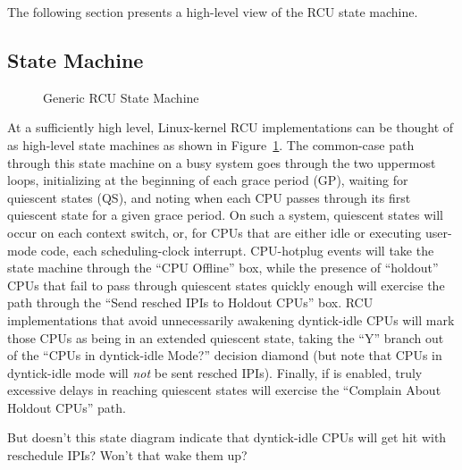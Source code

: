 The following section presents a high-level view of the RCU state machine.

\subsection{State Machine}
\label{app:rcuimpl:rcutree:State Machine}

\begin{figure}[htbp]
\centering
{}
\caption{Generic RCU State Machine}
\label{fig:app:rcuimpl:rcutree:Generic RCU State Machine}
\end{figure}

At a sufficiently high level, Linux-kernel RCU implementations can
be thought of as high-level state machines as shown in
Figure~\ref{fig:app:rcuimpl:rcutree:Generic RCU State Machine}.
The common-case path through this state machine on a busy system
goes through the two uppermost loops, initializing at the
beginning of each grace period (GP),
waiting for quiescent states (QS), and noting when each CPU passes through
its first quiescent state for a given grace period.
On such a system, quiescent states will occur on each context switch,
or, for CPUs that are either idle or executing user-mode code, each
scheduling-clock interrupt.
CPU-hotplug events will take the state machine through the
``CPU Offline'' box, while the presence of ``holdout''
CPUs that fail to pass through quiescent states quickly enough will exercise
the path through the ``Send resched IPIs to Holdout CPUs'' box.
RCU implementations that avoid unnecessarily awakening dyntick-idle
CPUs will mark those CPUs as being in an extended quiescent state,
taking the ``Y'' branch out of the ``CPUs in dyntick-idle
Mode?'' decision diamond (but note that CPUs in dyntick-idle mode
will \emph{not} be sent resched IPIs).
Finally, if  is enabled,
truly excessive delays in reaching quiescent states will exercise the
``Complain About Holdout CPUs'' path.

\QuickQuiz{}
	But doesn't this state diagram indicate that dyntick-idle CPUs will
	get hit with reschedule IPIs?  Won't that wake them up?
 \QuickQuizEnd


